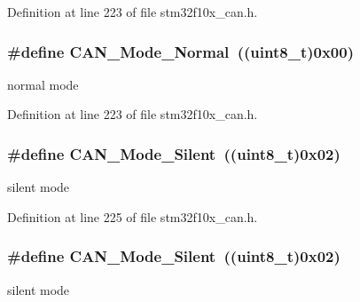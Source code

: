 Definition at line 223 of file stm32f10x\+\_\+can.\+h.

\subsubsection[{\texorpdfstring{C\+A\+N\+\_\+\+Mode\+\_\+\+Normal}{CAN_Mode_Normal}}]{\setlength{\rightskip}{0pt plus 5cm}\#define C\+A\+N\+\_\+\+Mode\+\_\+\+Normal~(({\bf uint8\+\_\+t})0x00)}\hypertarget{group___c_a_n___mode_gaaf1f48ab4917ccfd5fd31dd781d59e29}{}\label{group___c_a_n___mode_gaaf1f48ab4917ccfd5fd31dd781d59e29}
normal mode 

Definition at line 223 of file stm32f10x\+\_\+can.\+h.

\subsubsection[{\texorpdfstring{C\+A\+N\+\_\+\+Mode\+\_\+\+Silent}{CAN_Mode_Silent}}]{\setlength{\rightskip}{0pt plus 5cm}\#define C\+A\+N\+\_\+\+Mode\+\_\+\+Silent~(({\bf uint8\+\_\+t})0x02)}\hypertarget{group___c_a_n___mode_gac05e5d666f18eb35e8da70e6e17e8fb8}{}\label{group___c_a_n___mode_gac05e5d666f18eb35e8da70e6e17e8fb8}
silent mode 

Definition at line 225 of file stm32f10x\+\_\+can.\+h.

\subsubsection[{\texorpdfstring{C\+A\+N\+\_\+\+Mode\+\_\+\+Silent}{CAN_Mode_Silent}}]{\setlength{\rightskip}{0pt plus 5cm}\#define C\+A\+N\+\_\+\+Mode\+\_\+\+Silent~(({\bf uint8\+\_\+t})0x02)}\hypertarget{group___c_a_n___mode_gac05e5d666f18eb35e8da70e6e17e8fb8}{}\label{group___c_a_n___mode_gac05e5d666f18eb35e8da70e6e17e8fb8}
silent mode 

